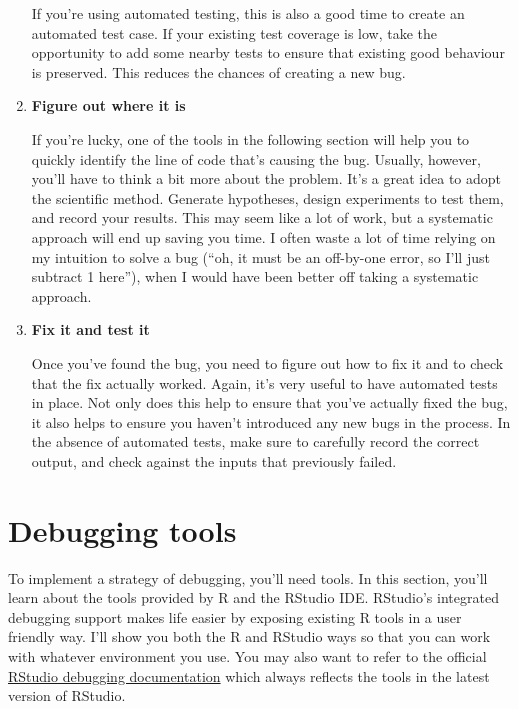 \begin{enumerate}
  If you're using automated testing, this is also a good time to create
  an automated test case. If your existing test coverage is low, take
  the opportunity to add some nearby tests to ensure that existing good
  behaviour is preserved. This reduces the chances of creating a new
  bug.
\item
  \textbf{Figure out where it is}

  If you're lucky, one of the tools in the following section will help
  you to quickly identify the line of code that's causing the bug.
  Usually, however, you'll have to think a bit more about the problem.
  It's a great idea to adopt the scientific method. Generate hypotheses,
  design experiments to test them, and record your results. This may
  seem like a lot of work, but a systematic approach will end up saving
  you time. I often waste a lot of time relying on my intuition to solve
  a bug (``oh, it must be an off-by-one error, so I'll just subtract 1
  here''), when I would have been better off taking a systematic
  approach.
\item
  \textbf{Fix it and test it}

  Once you've found the bug, you need to figure out how to fix it and to
  check that the fix actually worked. Again, it's very useful to have
  automated tests in place. Not only does this help to ensure that
  you've actually fixed the bug, it also helps to ensure you haven't
  introduced any new bugs in the process. In the absence of automated
  tests, make sure to carefully record the correct output, and check
  against the inputs that previously failed.
\end{enumerate}

\hypertarget{debugging-tools}{%
\section{Debugging tools}\label{debugging-tools}}

To implement a strategy of debugging, you'll need tools. In this
section, you'll learn about the tools provided by R and the RStudio IDE.
RStudio's integrated debugging support makes life easier by exposing
existing R tools in a user friendly way. I'll show you both the R and
RStudio ways so that you can work with whatever environment you use. You
may also want to refer to the official
\href{https://support.rstudio.com/hc/en-us/articles/205612627-Debugging-with-RStudio}{RStudio
debugging documentation} which always reflects the tools in the latest
version of RStudio.

